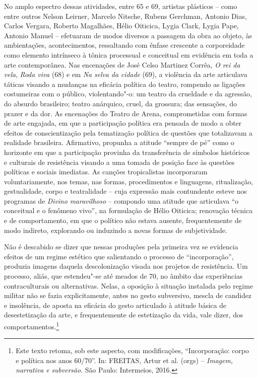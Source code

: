 No amplo espectro dessas atividades, entre 65 e 69, artistas plásticos
-- como entre outros Nelson Leirner, Marcelo Nitsche, Rubens Gerchman,
Antonio Dias, Carlos Vergara, Roberto Magalhães, Hélio Oiticica, Lygia
Clark, Lygia Pape, Antonio Manuel -- efetuaram de modos diversos a
passagem da obra ao objeto, às ambientações, acontecimentos, ressaltando
com ênfase crescente a corporeidade como elemento intrínseco à tônica
processual e conceitual em evidência em toda a arte contemporânea. Nas
encenações de José Celso Martinez Corrêa, \emph{O rei da vela},
\emph{Roda viva} (68) e em \emph{Na selva da cidade} (69), a violência da
arte articulava táticas visando a mudanças na eficácia política do
teatro, rompendo as ligações costumeiras com o público, violentando"-o:
um teatro da crueldade e da agressão, do absurdo brasileiro; teatro
anárquico, cruel, da grossura; das sensações, do prazer e da dor. As
encenações do Teatro de Arena, comprometidas com formas de arte
engajada, em que a participação política era pensada de modo a obter
efeitos de conscientização pela tematização política de questões que
totalizavam a realidade brasileira. Afirmativo, propunha a atitude
``sempre de pé'' como o horizonte em que a participação provinha da
transferência de símbolos históricos e culturais de resistência visando
a uma tomada de posição face às questões políticas e sociais imediatas.
As canções tropicalistas incorporaram voluntariamente, nos temas, nas
formas, procedimentos e linguagens, ritualização, gestualidade, corpo e
teatralidade -- cuja expressão mais contundente esteve nos programas de
 \emph{Divino maravilhoso} -- compondo uma atitude que articulava ``o
conceitual e o fenômeno vivo'', na formulação de Hélio Oiticica;
renovação técnica e de comportamento, em que o político não estava
ausente, frequentemente de modo indireto, explorando ou induzindo a
novas formas de subjetividade.

Não é descabido se dizer que nessas produções pela primeira vez se
evidencia efeitos de um regime estético que salientando o processo de
``incorporação'', produzia imagens daquela descolonização visada nos
projetos de resistência. Um processo, aliás, que estendeu"-se até meados
de 70, no âmbito das experiências contraculturais ou alternativas.
Nelas, a oposição à situação instalada pelo regime militar não se fazia
explicitamente, antes no gesto subversivo, mescla de candidez e
insolência, de aposta na eficácia do gesto articulado à atitude básica
de desestetização da arte, e frequentemente de estetização da vida,
vale dizer, dos comportamentos.\footnote{Este texto retoma, sob este
  aspecto, com modificações, ``Incorporação: corpo e política nos anos
  60/70''. In: \textsc{FREITAS}, Artur et al. (orgs) -- \emph{Imagem, narrativa e
  subversão.} São Paulo: Intermeios, 2016.}

